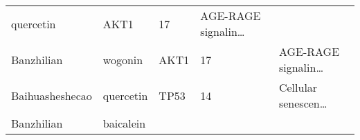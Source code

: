 \documentclass[
]{article}
\begin{document}
\begin{longtable}[]{@{}lllll@{}}
\begin{minipage}[t]{0.16\columnwidth}
quercetin\strut
\end{minipage} & \begin{minipage}[t]{0.12\columnwidth}\raggedright
AKT1\strut
\end{minipage} & \begin{minipage}[t]{0.19\columnwidth}\raggedright
17\strut
\end{minipage} & \begin{minipage}[t]{0.21\columnwidth}\raggedright
AGE-RAGE signalin\ldots{}\strut
\end{minipage}\tabularnewline
\begin{minipage}[t]{0.17\columnwidth}\raggedright
Banzhilian\strut
\end{minipage} & \begin{minipage}[t]{0.16\columnwidth}\raggedright
wogonin\strut
\end{minipage} & \begin{minipage}[t]{0.12\columnwidth}\raggedright
AKT1\strut
\end{minipage} & \begin{minipage}[t]{0.19\columnwidth}\raggedright
17\strut
\end{minipage} & \begin{minipage}[t]{0.21\columnwidth}\raggedright
AGE-RAGE signalin\ldots{}\strut
\end{minipage}\tabularnewline
\begin{minipage}[t]{0.17\columnwidth}\raggedright
Baihuasheshecao\strut
\end{minipage} & \begin{minipage}[t]{0.16\columnwidth}\raggedright
quercetin\strut
\end{minipage} & \begin{minipage}[t]{0.12\columnwidth}\raggedright
TP53\strut
\end{minipage} & \begin{minipage}[t]{0.19\columnwidth}\raggedright
14\strut
\end{minipage} & \begin{minipage}[t]{0.21\columnwidth}\raggedright
Cellular senescen\ldots{}\strut
\end{minipage}\tabularnewline
\begin{minipage}[t]{0.17\columnwidth}\raggedright
Banzhilian\strut
\end{minipage} & \begin{minipage}[t]{0.16\columnwidth}\raggedright
baicalein\strut
\end{minipage} & \begin{minipage}[t]{0.12\columnwidth}\raggedright

\end{minipage}
\end{longtable}
\end{document}
